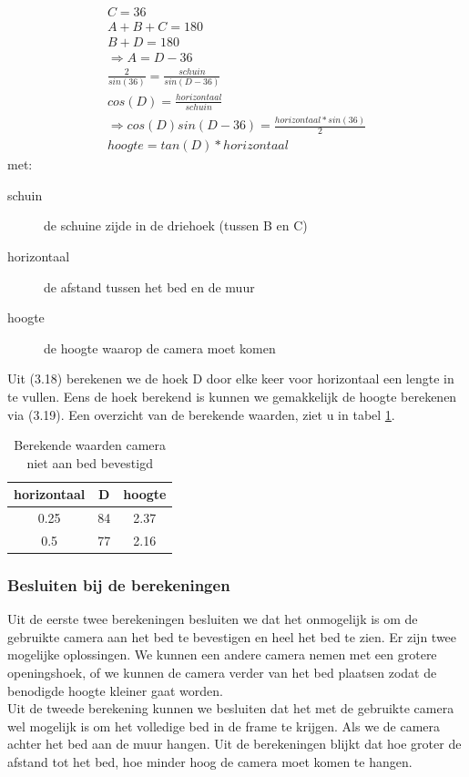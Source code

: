 \begin{gather}
C=36\\
A+B+C=180 \\
B+D=180 \\
\Rightarrow A=D-36\\
\frac{2}{sin(36)}=\frac{schuin}{sin(D-36)}\\
cos(D)=\frac{horizontaal}{schuin}\\
\Rightarrow cos(D)sin(D-36)=\frac{horizontaal*sin(36)}{2}\\
hoogte=tan(D)*horizontaal
\end{gather}
met:
\begin{description}
	\item[schuin] de schuine zijde in de driehoek (tussen B en C)
	\item[horizontaal] de afstand tussen het bed en de muur
	\item[hoogte] de hoogte waarop de camera moet komen
\end{description}
Uit (3.18) berekenen we de hoek D door elke keer voor horizontaal een lengte in te vullen. Eens de hoek berekend is kunnen we gemakkelijk de hoogte berekenen via (3.19). Een overzicht van de berekende waarden, ziet u in tabel \ref{refTabCNB}.

\begin{table}[hbp]
	\caption{Berekende waarden camera niet aan bed bevestigd}
	\begin{tabular}{|c|c|c|}
		\hline
		horizontaal & D & hoogte \\ \hline
		0.25 & 84 & 2.37 \\ \hline
		0.5 & 77 & 2.16 \\ 
		\hline
	\end{tabular}
	\label{refTabCNB}
\end{table}

\subsubsection{Besluiten bij de berekeningen}
Uit de eerste twee berekeningen besluiten we dat het onmogelijk is om de gebruikte camera aan het bed te bevestigen en heel het bed te zien. Er zijn twee mogelijke oplossingen. We kunnen een andere camera nemen met een grotere openingshoek, of we kunnen de camera verder van het bed plaatsen zodat de benodigde hoogte kleiner gaat worden.\\
Uit de tweede berekening kunnen we besluiten dat het met de gebruikte camera wel mogelijk is om het volledige bed in de frame te krijgen. Als we de camera achter het bed aan de muur hangen. Uit de berekeningen blijkt dat hoe groter de afstand tot het bed, hoe minder hoog de camera moet komen te hangen.

